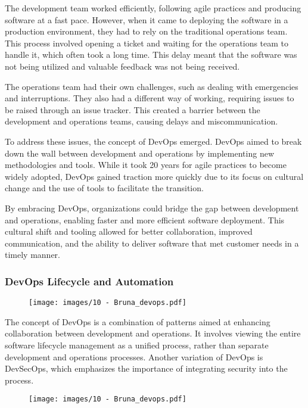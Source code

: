 The development team worked efficiently, following agile practices and
producing software at a fast pace. However, when it came to deploying
the software in a production environment, they had to rely on the
traditional operations team. This process involved opening a ticket and
waiting for the operations team to handle it, which often took a long
time. This delay meant that the software was not being utilized and
valuable feedback was not being received.

The operations team had their own challenges, such as dealing with
emergencies and interruptions. They also had a different way of working,
requiring issues to be raised through an issue tracker. This created a
barrier between the development and operations teams, causing delays and
miscommunication.

To address these issues, the concept of DevOps emerged. DevOps aimed to
break down the wall between development and operations by implementing
new methodologies and tools. While it took 20 years for agile practices
to become widely adopted, DevOps gained traction more quickly due to its
focus on cultural change and the use of tools to facilitate the
transition.

By embracing DevOps, organizations could bridge the gap between
development and operations, enabling faster and more efficient software
deployment. This cultural shift and tooling allowed for better
collaboration, improved communication, and the ability to deliver
software that met customer needs in a timely manner.

\subsubsection{DevOps Lifecycle and Automation}

\begin{figure}[!h]
  \centering
  \texttt{[image: images/10 - Bruna\_devops.pdf]}
\end{figure}

The concept of DevOps is a combination of patterns aimed at enhancing
collaboration between development and operations. It involves viewing
the entire software lifecycle management as a unified process, rather
than separate development and operations processes. Another variation of
DevOps is DevSecOps, which emphasizes the importance of integrating
security into the process.

\begin{figure}[!h]
  \centering
  \texttt{[image: images/10 - Bruna\_devops.pdf]}
\end{figure}

